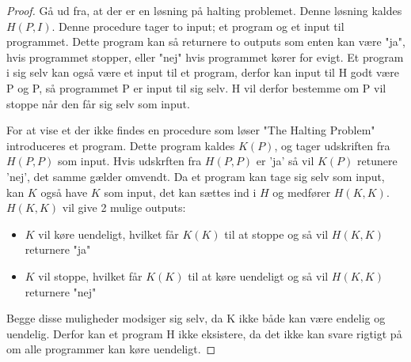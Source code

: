 \begin{proof}
Gå ud fra, at der er en løsning på halting problemet. Denne løsning kaldes $H(P, I)$. Denne procedure tager to input; et program og et input til programmet. Dette program kan så returnere to outputs som enten kan være "ja", hvis programmet stopper, eller "nej" hvis programmet kører for evigt. 
Et program i sig selv kan også være et input til et program, derfor kan input til H godt være P og P, så programmet P er input til sig selv.
H vil derfor bestemme om P vil stoppe når den får sig selv som input.

For at vise et der ikke findes en procedure som løser "The Halting Problem" introduceres et program. 
Dette program kaldes $K(P)$, og tager udskriften fra $H(P,P)$ som input.
Hvis udskrften fra $H(P,P)$ er 'ja' så vil $K(P)$ retunere 'nej', det samme gælder omvendt.  
Da et program kan tage sig selv som input, kan $K$ også have $K$ som input, det kan sættes ind i $H$ og  medfører $H(K,K)$. 
$H(K, K)$ vil give 2 mulige outputs:
\begin{itemize}
	\item $K$ vil køre uendeligt, hvilket får $K(K)$ til at stoppe og så vil $H(K,K)$ returnere "ja"
	\item  $K$ vil stoppe, hvilket får $K(K)$ til at køre uendeligt og så vil $H(K,K)$ returnere "nej"
\end{itemize}
Begge disse muligheder modsiger sig selv, da K ikke både kan være endelig og uendelig. Derfor kan et program H ikke eksistere, da det ikke kan svare rigtigt på om alle programmer kan køre uendeligt. 

\end{proof}
